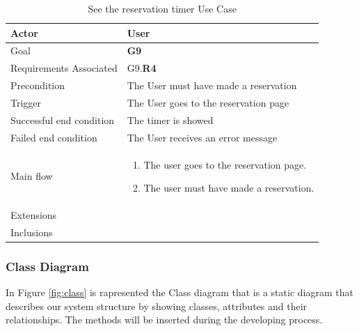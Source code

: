 \newline
\begin{table}[htb]
\begin{center}
\renewcommand{\arraystretch}{1.5}
\begin{tabular}{|l|p{}|}
\hline
Actor & User \\ \hline
Goal & \textbf{G9} \\ \hline
Requirements Associated & G9.\textbf{R4} \\ \hline
Precondition & The User must have made a reservation \\ \hline
Trigger & The User goes to the reservation page \\ \hline
Successful end condition & The timer is showed \\ \hline
Failed end condition & The User receives an error message \\ \hline
Main flow & \begin{minipage}[t]{0.6\textwidth}
\begin{enumerate}
\addtolength{\itemindent}{0.5cm}
\item The user goes to the reservation page.
\item The user must have made a reservation. 
\end{enumerate}
\end{minipage} \\ \hline
Extensions & \\ \hline
Inclusions & \\ \hline
\end{tabular}
\caption{ See the reservation timer Use Case}
\end{center}
\end{table}
\clearpage

\subsubsection{Class Diagram}
In Figure \ref{fig:class} is rapresented the Class diagram that is a static diagram that describes our system structure by showing classes, attributes and their relationships. The methods will be inserted during the developing process.



